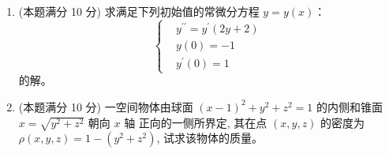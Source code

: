 \begin{enumerate}
{	\textbf{主证.} 记 $x_n=a+\alpha_n$，$y_n=b+\beta_n$，则 $\alpha_n\to0$，$\beta_n\to0$。于是
	\begin{align*}
	\frac{1}{n}\sum_{k=1}^{n}x_ky_{n+1-k}
	=\ &ab+\frac{b}{n}\sum_{k=1}^{n}\alpha_k+\frac{a}{n}\sum_{k=1}^{n}\beta_k\\
	&+\frac{1}{n}\sum_{k=1}^{n}\alpha_k\beta_{n+1-k} .
	\end{align*}
	由引理，第二、三项均 $\to0$。对第四项：收敛数列有界，设 $|\alpha_k|\leqslant M$，则
	\[
	\left|\frac{1}{n}\sum_{k=1}^{n}\alpha_k\beta_{n+1-k}\right|
	\leqslant\frac{M}{n}\sum_{j=1}^{n}\left|\beta_j\right|\to0 ,
	\]
	再次用到引理（对 $\left|\beta_j\right|\to0$）。综上，原极限 $=ab$。
}


\item
(本题满分 10 分)
求满足下列初始值的常微分方程 $y=y(x)$：
\[
\left\{\begin{aligned}
	&y^{\prime \prime}=y^{\prime}(2 y+2) \\
	&y(0)=-1 \\
	&y^{\prime}(0)=1
\end{aligned}\right.
\]
的解。



\item
(本题满分 10 分)
一空间物体由球面 $(x-1)^{2}+y^{2}+z^{2}=1$ 的内侧和锥面 $x=\sqrt{y^{2}+z^{2}}$ 朝向 $x$ 轴 正向的一侧所界定, 其在点 $(x, y, z)$ 的密度为 $\rho(x, y, z)=1-\left(y^{2}+z^{2}\right)$, 试求该物体的质量。


\end{enumerate}

